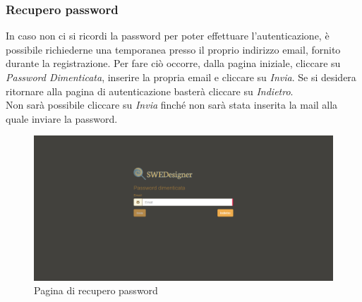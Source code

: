 \subsubsection{Recupero password}
In caso non ci si ricordi la password per poter effettuare l'autenticazione, è possibile richiederne una temporanea presso il proprio indirizzo email, fornito durante la registrazione. Per fare ciò occorre, dalla pagina iniziale, cliccare su \textit{Password Dimenticata}, inserire la propria email e cliccare su \textit{Invia}. Se si desidera ritornare alla pagina di autenticazione basterà cliccare su \textit{Indietro}.\\
Non sarà possibile cliccare su \textit{Invia} finché non sarà stata inserita la mail alla quale inviare la password.\\
\begin{figure}[H]
	\centering
		\includegraphics[width=1\linewidth]{res/img/password.png}
	\caption{Pagina di recupero password}
\end{figure}
\newpage
